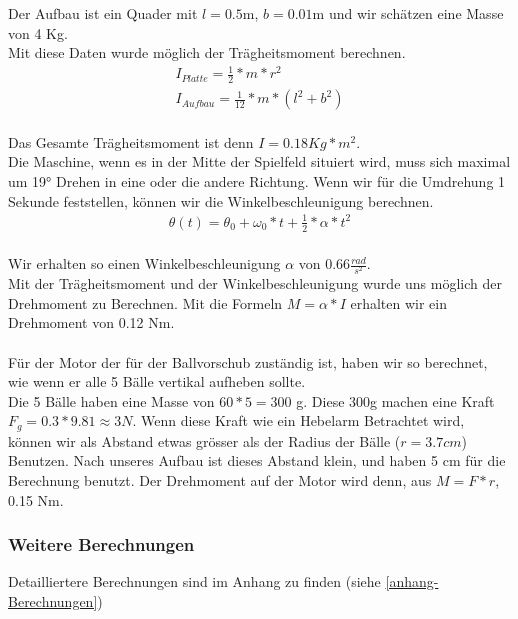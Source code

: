 Der Aufbau ist ein Quader mit $l=0.5$m, $b=0.01$m und wir schätzen eine Masse von 4 Kg.\\
Mit diese Daten wurde möglich der Trägheitsmoment berechnen.\\
\begin{gather}
	I_{Platte}=\frac{1}{2}*m*r^2 \\
	I_{Aufbau}=\frac{1}{12}*m*(l^2+b^2)
\end{gather}\\
Das Gesamte Trägheitsmoment ist denn $I=0.18 Kg*m^2$.\\
Die Maschine, wenn es in der Mitte der Spielfeld situiert wird, muss sich maximal um 19° Drehen in eine oder die andere Richtung. Wenn wir für die Umdrehung 1 Sekunde feststellen, können wir die Winkelbeschleunigung berechnen. \\
\begin{gather}
	\theta(t)=\theta_0+\omega_0*t+\frac{1}{2}*\alpha*t^2
\end{gather}\\
Wir erhalten so einen Winkelbeschleunigung $\alpha$ von 0.66$\frac{rad}{s^2}$.\\
Mit der Trägheitsmoment und der Winkelbeschleunigung wurde uns möglich der Drehmoment zu Berechnen.
Mit die Formeln $M=\alpha*I$ erhalten wir ein Drehmoment von 0.12 Nm.\\ \\
Für der Motor der für der Ballvorschub zuständig ist, haben wir so berechnet, wie wenn er alle 5 Bälle vertikal aufheben sollte.\\
Die 5 Bälle haben eine Masse von $60*5=300$ g. Diese 300g machen eine Kraft $F_g=0.3*9.81\approx3 N$. Wenn diese Kraft wie ein Hebelarm Betrachtet wird, können wir als Abstand etwas grösser als der Radius der Bälle ($r=3.7cm$) Benutzen. Nach unseres Aufbau ist dieses Abstand klein, und haben 5 cm für die Berechnung benutzt. Der Drehmoment auf der Motor wird denn, aus $M=F*r$, 0.15 Nm.\\
\newpage


\subsubsection{Weitere Berechnungen}
Detailliertere Berechnungen sind im Anhang zu finden (siehe \ref{anhang-Berechnungen})